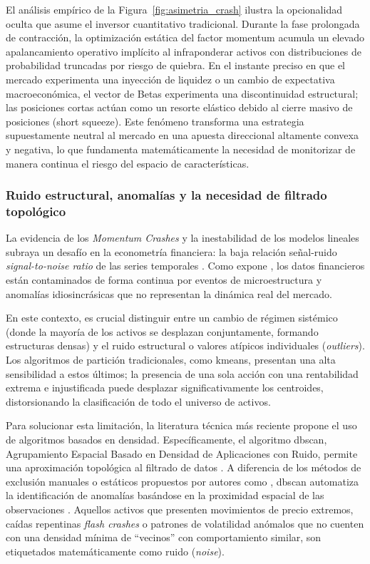 \documentclass[
]{article}
\begin{document}
	El análisis empírico de la Figura~\ref{fig:asimetria_crash} ilustra la opcionalidad oculta que asume el inversor cuantitativo tradicional. Durante la fase prolongada de contracción, la optimización estática del factor \gls{momentum} acumula un elevado apalancamiento operativo implícito al infraponderar activos con distribuciones de probabilidad truncadas por riesgo de quiebra. En el instante preciso en que el mercado experimenta una inyección de liquidez o un cambio de expectativa macroeconómica, el vector de Betas experimenta una discontinuidad estructural; las posiciones cortas actúan como un resorte elástico debido al cierre masivo de posiciones (short squeeze). Este fenómeno transforma una estrategia supuestamente neutral al mercado en una apuesta direccional altamente convexa y negativa, lo que fundamenta matemáticamente la necesidad de monitorizar de manera continua el riesgo del espacio de características.
	
	\subsubsection{Ruido estructural, anomalías y la necesidad de filtrado
		topológico}\label{ruido-estructural-anomaluxedas-y-la-necesidad-de-filtrado-topoluxf3gico}
	
	La evidencia de los \emph{Momentum Crashes} y la inestabilidad de los
	modelos lineales subraya un desafío en la econometría financiera: la
	baja relación señal-ruido \emph{signal-to-noise ratio} de las series temporales \parencite{HASBROUCK2001383, Roll01051984}.
	Como expone \textcite{lopezdeprado2018}, los datos financieros están contaminados de
	forma continua por eventos de microestructura y anomalías
	idiosincrásicas que no representan la dinámica real del mercado.
	
	En este contexto, es crucial distinguir entre un cambio de régimen
	sistémico (donde la mayoría de los activos se desplazan conjuntamente,
	formando estructuras densas) y el ruido estructural o valores atípicos
	individuales (\emph{outliers}). Los algoritmos de partición
	tradicionales, como \gls{kmeans}, presentan una alta sensibilidad a estos
	últimos; la presencia de una sola acción con una rentabilidad extrema e
	injustificada puede desplazar significativamente los centroides,
	distorsionando la clasificación de todo el universo de activos.
	
	Para solucionar esta limitación, la literatura técnica más reciente
	propone el uso de algoritmos basados en densidad. Específicamente, el
	algoritmo \gls{dbscan},  Agrupamiento Espacial Basado en Densidad de Aplicaciones con Ruido, permite una aproximación topológica al filtrado de datos \parencite{GIDEA2018820, de2025enhancing}. A
	diferencia de los métodos de exclusión manuales o estáticos propuestos
	por autores como \textcite{aslam2025identifying}, \gls{dbscan} automatiza la identificación de
	anomalías basándose en la proximidad espacial de las observaciones
	\parencite{shiraj2024anomaly}. Aquellos activos que presenten movimientos de
	precio extremos, caídas repentinas \emph{flash crashes} o patrones de volatilidad anómalos
	que no cuenten con una densidad mínima de ``vecinos'' con comportamiento
	similar, son etiquetados matemáticamente como ruido (\emph{noise}).
	
\end{document}
